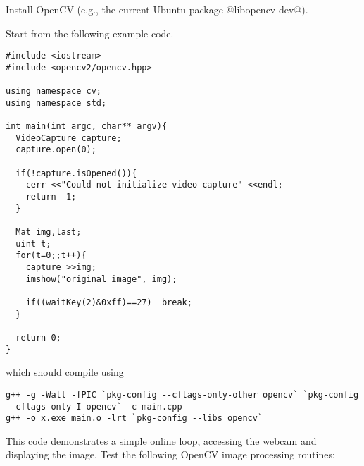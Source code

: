 

\renewcommand{\course}{Robotics}
\renewcommand{\coursepicture}{roboticsLecture}
\renewcommand{\coursedate}{Winter 2014}
\renewcommand{\exnum}{15}

\exercises



Install OpenCV (e.g., the current Ubuntu package @libopencv-dev@).

Start from the following example code.

\begin{code}
\begin{verbatim}
#include <iostream>
#include <opencv2/opencv.hpp>

using namespace cv;
using namespace std;

int main(int argc, char** argv){
  VideoCapture capture;
  capture.open(0);

  if(!capture.isOpened()){
    cerr <<"Could not initialize video capture" <<endl;
    return -1;
  }

  Mat img,last;
  uint t;
  for(t=0;;t++){
    capture >>img;
    imshow("original image", img);

    if((waitKey(2)&0xff)==27)  break;
  }

  return 0;
}
\end{verbatim}
\end{code}
which should compile using\\
\begin{code}
\begin{verbatim}
g++ -g -Wall -fPIC `pkg-config --cflags-only-other opencv` `pkg-config --cflags-only-I opencv` -c main.cpp
g++ -o x.exe main.o -lrt `pkg-config --libs opencv`
\end{verbatim}
\end{code}

This code demonstrates a simple online loop, accessing the webcam and
displaying the image. Test the following
OpenCV image processing routines:

